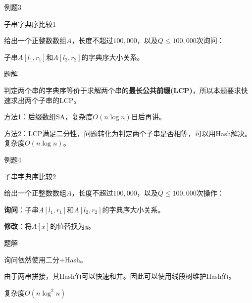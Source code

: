 \documentclass{ctexbeamer}		%
\begin{document}
\begin{frame}{例题3}

\begin{block}{子串字典序比较1}

给出一个正整数数组$A$，长度不超过$100,000$，以及$Q \leq 100,000$次询问：

子串$A[l_1, r_1]$和$A[l_2, r_2]$的字典序大小关系。

\end{block}

\pause

\begin{block}{题解}

判定两个串的字典序等价于求解两个串的\textbf{最长公共前缀(LCP)}，所以本题要求快速求出两个子串的LCP。

\pause

方法1：后缀数组SA，复杂度$O(n \log n)$日后再讲。

\pause

\hphantom{}

方法2：LCP满足二分性，问题转化为判定两个子串是否相等，可以用Hash解决。复杂度$O(n \log n)$。

\end{block}
\end{frame}

\begin{frame}{例题4}

\begin{block}{子串字典序比较2}

给出一个正整数数组$A$，长度不超过$100,000$，以及$Q \leq 100,000$次操作：

\textbf{询问}：子串$A[l_1, r_1]$和$A[l_2, r_2]$的字典序大小关系。

\textbf{修改}：将$A[x]$的值替换为\textit{y}。

\end{block}

\pause

\begin{block}{题解}

询问依然使用二分+Hash。

由于两串拼接，其Hash值可以快速和并。因此可以使用线段树维护Hash值。

复杂度$O(n \log^{2} n)$

\end{block}

\end{frame}
\end{document}
